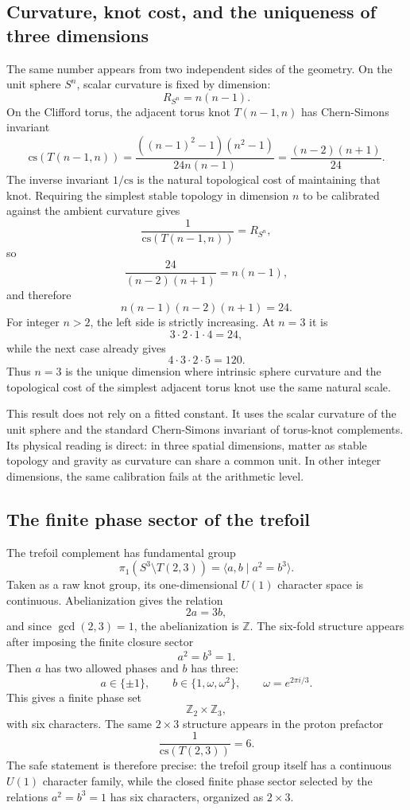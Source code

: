 
\subsection{Curvature, knot cost, and the uniqueness of three dimensions}

The same number appears from two independent sides of the geometry.  On the unit sphere \(S^n\), scalar curvature is fixed by dimension:
\[
R_{S^n}=n(n-1).
\]
On the Clifford torus, the adjacent torus knot \(T(n-1,n)\) has Chern-Simons invariant
\[
\mathrm{cs}(T(n-1,n))
=
\frac{((n-1)^2-1)(n^2-1)}{24n(n-1)}
=
\frac{(n-2)(n+1)}{24}.
\]
The inverse invariant \(1/\mathrm{cs}\) is the natural topological cost of maintaining that knot.  Requiring the simplest stable topology in dimension \(n\) to be calibrated against the ambient curvature gives
\[
\frac{1}{\mathrm{cs}(T(n-1,n))}=R_{S^n},
\]
so
\[
\frac{24}{(n-2)(n+1)}=n(n-1),
\]
and therefore
\[
n(n-1)(n-2)(n+1)=24.
\]
For integer \(n>2\), the left side is strictly increasing.  At \(n=3\) it is
\[
3\cdot2\cdot1\cdot4=24,
\]
while the next case already gives
\[
4\cdot3\cdot2\cdot5=120.
\]
Thus \(n=3\) is the unique dimension where intrinsic sphere curvature and the topological cost of the simplest adjacent torus knot use the same natural scale.

This result does not rely on a fitted constant.  It uses the scalar curvature of the unit sphere and the standard Chern-Simons invariant of torus-knot complements.  Its physical reading is direct: in three spatial dimensions, matter as stable topology and gravity as curvature can share a common unit.  In other integer dimensions, the same calibration fails at the arithmetic level.

\subsection{The finite phase sector of the trefoil}

The trefoil complement has fundamental group
\[
\pi_1(S^3\setminus T(2,3))
=
\langle a,b\mid a^2=b^3\rangle.
\]
Taken as a raw knot group, its one-dimensional \(U(1)\) character space is continuous.  Abelianization gives the relation
\[
2a=3b,
\]
and since \(\gcd(2,3)=1\), the abelianization is \(\mathbb Z\).  The six-fold structure appears after imposing the finite closure sector
\[
a^2=b^3=1.
\]
Then \(a\) has two allowed phases and \(b\) has three:
\[
a\in\{\pm1\},
\qquad
b\in\{1,\omega,\omega^2\},
\qquad
\omega=e^{2\pi i/3}.
\]
This gives a finite phase set
\[
\mathbb Z_2\times\mathbb Z_3,
\]
with six characters.  The same \(2\times3\) structure appears in the proton prefactor
\[
\frac{1}{\mathrm{cs}(T(2,3))}=6.
\]
The safe statement is therefore precise: the trefoil group itself has a continuous \(U(1)\) character family, while the closed finite phase sector selected by the relations \(a^2=b^3=1\) has six characters, organized as \(2\times3\).

